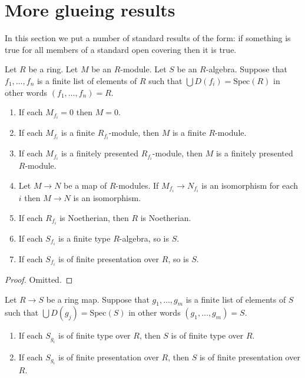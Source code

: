 \section{More glueing results}
\label{section-more-glueing}

\noindent
In this section we put a number of standard results of the
form: if something is true for all members of a standard open
covering then it is true.

\begin{lemma}
\label{lemma-cover}
Let $R$ be a ring. Let $M$ be an $R$-module. Let $S$ be an $R$-algebra.
Suppose that $f_1, \ldots, f_n$ is a finite list of
elements of $R$ such that $\bigcup D(f_i) = \text{Spec}(R)$
in other words $(f_1, \ldots, f_n) = R$.
\begin{enumerate}
\item If each $M_{f_i} = 0$ then $M = 0$.
\item If each $M_{f_i}$ is a finite $R_{f_i}$-module,
then $M$ is a finite $R$-module.
\item If each $M_{f_i}$ is a finitely presented $R_{f_i}$-module,
then $M$ is a finitely presented $R$-module.
\item Let $M \to N$ be a map of $R$-modules. If $M_{f_i} \to N_{f_i}$
is an isomorphism for each $i$ then $M \to N$ is an isomorphism.
\item If each $R_{f_i}$ is Noetherian, then $R$ is Noetherian.
\item If each $S_{f_i}$ is a finite type $R$-algebra, so is $S$.
\item If each $S_{f_i}$ is of finite presentation over $R$, so is $S$.
\end{enumerate}
\end{lemma}

\begin{proof}
Omitted.
\end{proof}

\begin{lemma}
\label{lemma-cover-upstairs}
Let $R \to S$ be a ring map.
Suppose that $g_1, \ldots, g_m$ is a finite list of
elements of $S$ such that $\bigcup D(g_j) = \text{Spec}(S)$
in other words $(g_1, \ldots, g_m) = S$.
\begin{enumerate}
\item If each $S_{g_i}$ is of finite type over $R$, then $S$ is
of finite type over $R$.
\item If each $S_{g_i}$ is of finite presentation over $R$,
then $S$ is of finite presentation over $R$.
\end{enumerate}
\end{lemma}


